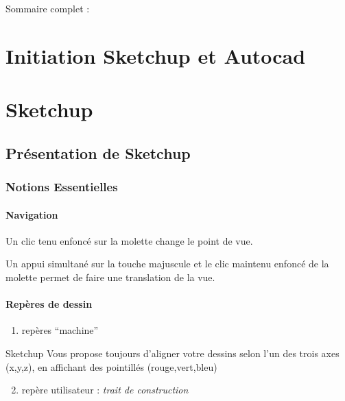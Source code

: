 \documentclass[a4paper,12pt,french]{sphinxmanual}
\begin{document}
Sommaire complet :


\chapter{Initiation Sketchup et Autocad}
\label{init_su+acad/index:initiation-sketchup-et-autocad}\label{init_su+acad/index:index-init-su-acad}\label{init_su+acad/index::doc}\label{init_su+acad/index:documentation-canopee}

\chapter{Sketchup}
\label{su/index:sketchup}\label{su/index::doc}\label{su/index:index-su}

\section{Présentation de Sketchup}
\label{su/intro-su:presentation-de-sketchup}\label{su/intro-su::doc}

\subsection{Notions Essentielles}
\label{su/intro-su:notions-essentielles}\label{su/intro-su:notions-essentielles-su}

\subsubsection{Navigation}
\label{su/intro-su:navigation}
Un clic tenu enfoncé sur la molette change le point de vue.

Un appui simultané sur la touche majuscule et le clic maintenu enfoncé de la molette permet de faire une translation de la vue.


\subsubsection{Repères de dessin}
\label{su/intro-su:reperes-de-dessin}\begin{enumerate}
\item {} 
repères ``machine''

\end{enumerate}

Sketchup Vous propose toujours d'aligner votre dessins selon l'un des trois axes (x,y,z), en affichant des pointillés (rouge,vert,bleu)
\begin{enumerate}
\setcounter{enumi}{1}
\item {} 
repère utilisateur : \emph{trait de construction}

\end{enumerate}
\end{document}
